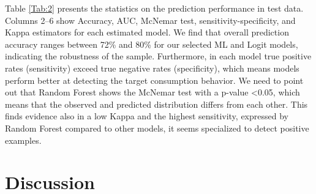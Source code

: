 \documentclass[a4,12pt]{article}
\begin{document}
Table \ref{Tab:2} presents the statistics on the prediction performance in test data. Columns 2–6 show Accuracy, AUC, McNemar test, sensitivity-specificity, and Kappa estimators for each estimated model. 
We find that overall prediction accuracy ranges between 72\% and 80\% for our selected ML and Logit models, indicating the robustness of the sample. 
Furthermore, in each model true positive rates (sensitivity) exceed true negative rates (specificity), which means models perform better at detecting the target consumption behavior. We need to point out that Random Forest shows the McNemar test with a p-value <0.05, which means that the observed and predicted distribution differs from each other. This finds evidence also in a low Kappa and the highest sensitivity, expressed by Random Forest compared to other models, it seems specialized to detect positive examples.


\section{Discussion}
\label{sec:5}
\end{document}
